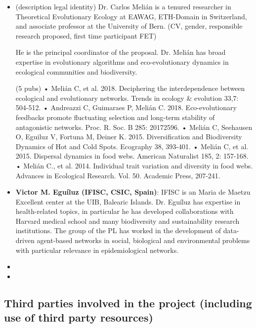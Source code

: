 \documentclass[11pt, a4paper]{article} %
\begin{document}
 \begin{itemize}
 \item (description legal identity) Dr. Carlos Meli\'an is a tenured
   researcher in Theoretical Evolutionary Ecology at EAWAG, ETH-Domain
   in Switzerland, and associate professor at the University of Bern.
       (CV, gender, responsible research proposed, first time participant FET)

       He is the principal coordinator of the proposal.  Dr. Meli\'an
       has broad expertise in evolutionary algorithms and
       eco-evolutionary dynamics in ecological communities and
       biodiversity.
  
       (5 pubs)
       • Melián C, et al. 2018. Deciphering the interdependence
       between ecological and evolutionary networks. Trends in ecology
       & evolution 33,7: 504-512.  • Andreazzi C, Guimaraes P, Melián
       C. 2018. Eco-evolutionary feedbacks promote fluctuating
       selection and long-term stability of antagonistic
       networks. Proc. R. Soc. B 285: 20172596.  • Melián C, Seehausen
       O, Eguiluz V, Fortuna M, Deiner K. 2015. Diversification and
       Biodiversity Dynamics of Hot and Cold Spots. Ecography 38,
       393-401.  • Melián C, et al. 2015. Dispersal dynamics in food
       webs. American Naturalist 185, 2: 157-168.  • Melián C., et
       al. 2014. Individual trait variation and diversity in food
       webs. Advances in Ecological Research. Vol. 50. Academic Press,
       207-241.



 \item {\bf Victor M. Egu\'iluz (IFISC, CSIC, Spain)}: IFISC is an
   Maria de Maetzu Excellent center at the UIB, Balearic
   Islands. Dr. Egu\'iluz has expertise in health-related topics, in
   particular he has developed collaborations with Harvard medical
   school and many biodiversity and sustainability research
   institutions. The group of the PL has worked in the development of
   data-driven agent-based networks in social, biological and
   environmental problems with particular relevance in epidemiological
   networks.
\item
\item
   \end{itemize}

 
 \subsection{Third parties involved in the project (including use of third party resources)}
\end{document}
